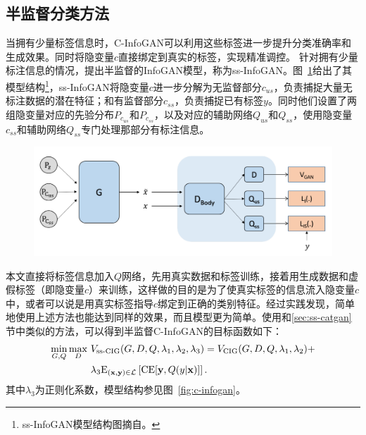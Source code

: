 \subsection{半监督分类方法}
当拥有少量标签信息时，C-InfoGAN可以利用这些标签进一步提升分类准确率和生成效果。同时将隐变量$c$直接绑定到真实的标签，实现精准调控。
针对拥有少量标注信息的情况，\citet{spurr2017guiding}提出半监督的InfoGAN模型，称为ss-InfoGAN。图~\ref{fig:arch-ssinfogan}给出了其模型结构\footnote{ss-InfoGAN模型结构图摘自\citet{spurr2017guiding}。}，ss-InfoGAN将隐变量$c$进一步分解为无监督部分$c_{us}$，负责捕捉大量无标注数据的潜在特征；和有监督部分$c_{ss}$，负责捕捉已有标签$y$。同时他们设置了两组隐变量对应的先验分布$P_{c_{us}}$和$P_{c_{ss}}$，以及对应的辅助网络$Q_{us}$和$Q_{ss}$，使用隐变量$c_{ss}$和辅助网络$Q_{ss}$专门处理那部分有标注信息。
\begin{figure}[htbp]
  \centering
  \includegraphics[width=\onef\textwidth]{Img/arch-ssinfogan.png}
  \label{fig:arch-ssinfogan}
\end{figure}
本文直接将标签信息加入$Q$网络，先用真实数据和标签训练，接着用生成数据和虚假标签（即隐变量$c$）来训练，这样做的目的是为了使真实标签的信息流入隐变量$c$中，或者可以说是用真实标签指导$c$绑定到正确的类别特征。经过实践发现，简单地使用上述方法也能达到同样的效果，而且模型更为简单。使用和\ref{sec:ss-catgan}节中类似的方法，可以得到半监督C-InfoGAN的目标函数如下：
\begin{equation}\label{eq:ss-cinfogan-obj}
  \begin{split}
  \min_{G,Q}\max_D~ &V_{\text{ss-CIG}}(G,D,Q,\lambda_1,\lambda_2,\lambda_3) = 
  V_{\text{CIG}}(G,D,Q,\lambda_1,\lambda_2) + \\
  &\lambda_3 \text{E}_{(\mathbf{x}, \mathbf{y}) \in \mathcal{L}}
  \left[ \text{CE}[\mathbf{y}, Q(y|\mathbf{x})] \right].
  \end{split}
\end{equation}
其中$\lambda_3$为正则化系数，模型结构参见图~\ref{fig:c-infogan}。

